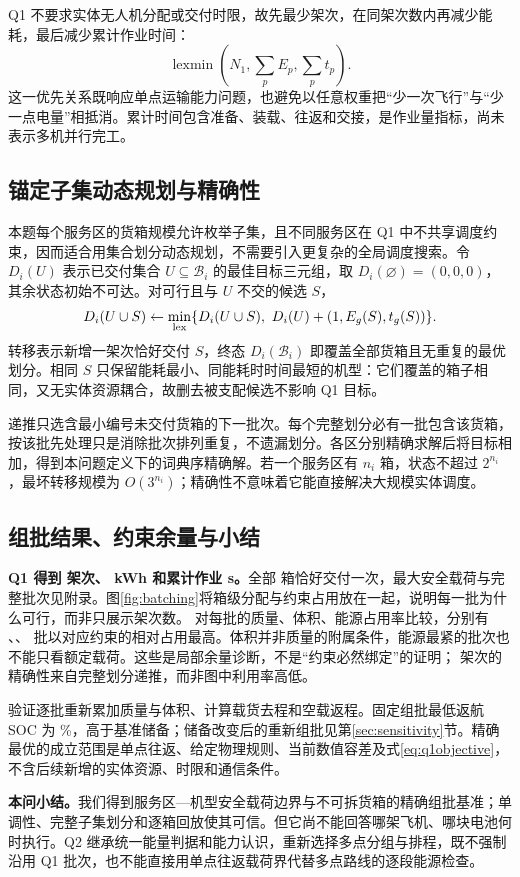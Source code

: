 Q1 不要求实体无人机分配或交付时限，故先最少架次，在同架次数内再减少能耗，最后减少累计作业时间：
\begin{equation}
\operatorname{lexmin}\left(N_1,\sum_pE_p,\sum_pt_p\right).\label{eq:q1objective}
\end{equation}
这一优先关系既响应单点运输能力问题，也避免以任意权重把“少一次飞行”与“少一点电量”相抵消。累计时间包含准备、装载、往返和交接，是作业量指标，尚未表示多机并行完工。

\subsection{锚定子集动态规划与精确性}
本题每个服务区的货箱规模允许枚举子集，且不同服务区在 Q1 中不共享调度约束，因而适合用集合划分动态规划，不需要引入更复杂的全局调度搜索。令 $D_i(U)$ 表示已交付集合 $U\subseteq\mathcal B_i$ 的最佳目标三元组，取 $D_i(\varnothing)=(0,0,0)$，其余状态初始不可达。对可行且与 $U$ 不交的候选 $S$，
\begin{equation}
D_i(U\cup S)\leftarrow\min_{\rm lex}
\{D_i(U\cup S),\ D_i(U)+(1,E_g(S),t_g(S))\}.\label{eq:dp}
\end{equation}
转移表示新增一架次恰好交付 $S$，终态 $D_i(\mathcal B_i)$ 即覆盖全部货箱且无重复的最优划分。相同 $S$ 只保留能耗最小、同能耗时时间最短的机型：它们覆盖的箱子相同，又无实体资源耦合，故删去被支配候选不影响 Q1 目标。

递推只选含最小编号未交付货箱的下一批次。每个完整划分必有一批包含该货箱，按该批先处理只是消除批次排列重复，不遗漏划分。各区分别精确求解后将目标相加，得到本问题定义下的词典序精确解。若一个服务区有 $n_i$ 箱，状态不超过 $2^{n_i}$，最坏转移规模为 $O(3^{n_i})$；精确性不意味着它能直接解决大规模实体调度。

\subsection{组批结果、约束余量与小结}
\textbf{Q1 得到 \QOneTrips{} 架次、\QOneEnergy{} kWh 和累计作业 \QOneTime{} s。}全部 \NumBoxes{} 箱恰好交付一次，最大安全载荷与完整批次见附录。图\ref{fig:batching}将箱级分配与约束占用放在一起，说明每一批为什么可行，而非只展示架次数。
对每批的质量、体积、能源占用率比较，分别有 \MassTightBatches{}、\VolumeTightBatches{}、\EnergyTightBatches{} 批以对应约束的相对占用最高。体积并非质量的附属条件，能源最紧的批次也不能只看额定载荷。这些是局部余量诊断，不是“约束必然绑定”的证明；\QOneTrips{} 架次的精确性来自完整划分递推，而非图中利用率高低。

验证逐批重新累加质量与体积、计算载货去程和空载返程。固定组批最低返航 SOC 为 \QOneReserveLimit\%，高于基准储备；储备改变后的重新组批见第\ref{sec:sensitivity}节。精确最优的成立范围是单点往返、给定物理规则、当前数值容差及式\eqref{eq:q1objective}，不含后续新增的实体资源、时限和通信条件。

\textbf{本问小结。}我们得到服务区—机型安全载荷边界与不可拆货箱的精确组批基准；单调性、完整子集划分和逐箱回放使其可信。但它尚不能回答哪架飞机、哪块电池何时执行。Q2 继承统一能量判据和能力认识，重新选择多点分组与排程，既不强制沿用 Q1 批次，也不能直接用单点往返载荷界代替多点路线的逐段能源检查。
\FloatBarrier
